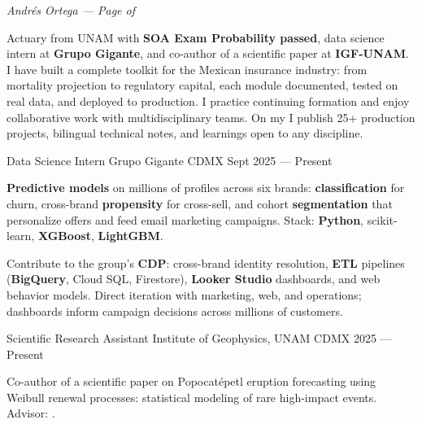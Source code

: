 \documentclass[10pt, letterpaper]{awesome-cv}
\renewcommand{\acvSectionContentTopSkip}{0.3mm}
\renewenvironment{cvparagraph}{%
  \vspace{\acvSectionContentTopSkip}%
  \vspace{-3mm}%
  \paragraphstyle%
}{%
  \par%
  \vspace{0.3mm}%
}
\renewcommand*{\paragraphstyle}{\fontsize{8.5pt}{1.15em}\bodyfontlight\upshape\color{text}}
\begin{document}
\makecvheader[C]


\makecvfooter
  {}
  {\color{lightgray}\textit{\small Andrés Ortega — Page \thepage{} of \pageref*{LastPage}}}
  {}


\begin{cvparagraph}
Actuary from UNAM with \textbf{SOA Exam Probability passed}, data science intern at \textbf{Grupo Gigante}, and co-author of a scientific paper at \textbf{IGF-UNAM}. I have built a complete toolkit for the Mexican insurance industry: from mortality projection to regulatory capital, each module documented, tested on real data, and deployed to production. I practice continuing formation and enjoy collaborative work with multidisciplinary teams. On my  I publish 25+ production projects, bilingual technical notes, and learnings open to any discipline.
\end{cvparagraph}


\begin{cventries}

  \cventry
    {Data Science Intern}
    {Grupo Gigante}
    {CDMX}
    {Sept 2025 — Present}
    {
      \begin{cvitems}
        \item {\textbf{Predictive models} on millions of profiles across six brands: \textbf{classification} for churn, cross-brand \textbf{propensity} for cross-sell, and cohort \textbf{segmentation} that personalize offers and feed email marketing campaigns. Stack: \textbf{Python}, scikit-learn, \textbf{XGBoost}, \textbf{LightGBM}.}
        \item {Contribute to the group's \textbf{CDP}: cross-brand identity resolution, \textbf{ETL} pipelines (\textbf{BigQuery}, Cloud SQL, Firestore), \textbf{Looker Studio} dashboards, and web behavior models. Direct iteration with marketing, web, and operations; dashboards inform campaign decisions across millions of customers.}
      \end{cvitems}
    }

  \cventry
    {Scientific Research Assistant }
    {Institute of Geophysics, UNAM}
    {CDMX}
    {2025 — Present}
    {
      \begin{cvitems}
        \item {Co-author of a scientific paper on Popocatépetl eruption forecasting using Weibull renewal processes: statistical modeling of rare high-impact events. Advisor: .}
      \end{cvitems}
    }

\end{cventries}
\end{document}

